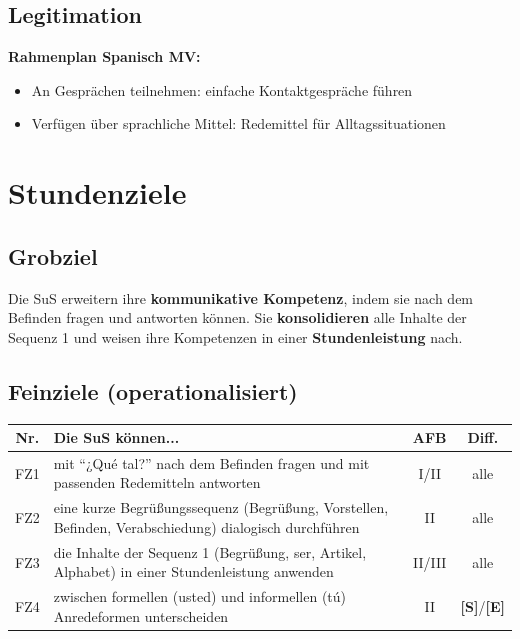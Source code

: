 \documentclass[11pt,a4paper]{article}
\newcommand{\Std}{\textcolor{standard}{\textbf{[S]}}}
\newcommand{\E}{\textcolor{erweiterung}{\textbf{[E]}}}
\begin{document}
\subsection{Legitimation}
\textbf{Rahmenplan Spanisch MV:}
\begin{itemize}
    \item An Gesprächen teilnehmen: einfache Kontaktgespräche führen
    \item Verfügen über sprachliche Mittel: Redemittel für Alltagssituationen
\end{itemize}

\section{Stundenziele}

\subsection{Grobziel}
Die SuS erweitern ihre \textbf{kommunikative Kompetenz}, indem sie nach dem Befinden fragen und antworten können. Sie \textbf{konsolidieren} alle Inhalte der Sequenz 1 und weisen ihre Kompetenzen in einer \textbf{Stundenleistung} nach.

\subsection{Feinziele (operationalisiert)}
\begin{tabular}{|c|p{8cm}|c|c|}
\hline
\textbf{Nr.} & \textbf{Die SuS können...} & \textbf{AFB} & \textbf{Diff.} \\
\hline
FZ1 & mit ``¿Qué tal?'' nach dem Befinden fragen und mit passenden Redemitteln antworten & I/II & alle \\
\hline
FZ2 & eine kurze Begrüßungssequenz (Begrüßung, Vorstellen, Befinden, Verabschiedung) dialogisch durchführen & II & alle \\
\hline
FZ3 & die Inhalte der Sequenz 1 (Begrüßung, ser, Artikel, Alphabet) in einer Stundenleistung anwenden & II/III & alle \\
\hline
FZ4 & zwischen formellen (usted) und informellen (tú) Anredeformen unterscheiden & II & \Std{}/\E{} \\
\hline
\end{tabular}

\end{document}

